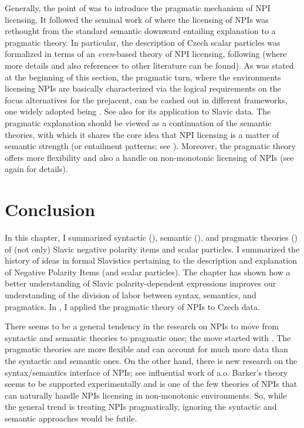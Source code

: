 \documentclass[output=paper,colorlinks,citecolor=brown]{langscibook}
\begin{document}
\noindent Generally, the point of  was to introduce the pragmatic mechanism of NPI licensing. It followed the seminal work of \citet{krifka1995semantics} where the licensing of NPIs was rethought from the standard semantic downward entailing explanation to a pragmatic theory. In particular, the description of Czech scalar particles was formalized in terms of an \textit{even}-based theory of NPI licensing, following \citet{Crnic2011} (where more details and also references to other literature can be found). As was stated at the beginning of this section, the pragmatic turn, where the environments licensing NPIs are basically characterized via the logical requirements on the focus alternatives for the prejacent, can be cashed out in different frameworks, one widely adopted being \citet{Chierchia2013}. See also \citet{gajic18} for its application to Slavic data. The pragmatic explanation should be viewed as a continuation of the semantic theories, %
with which it shares the core idea that NPI licensing is a matter of semantic strength (or entailment patterns; see ).
Moreover, the pragmatic theory offers more flexibility and also a handle on non-monotonic licensing of NPIs (see again \citealt{Crnic2011} for details).

\section{Conclusion}

In this chapter, I summarized syntactic (), semantic (), and pragmatic theories () of (not only) Slavic negative polarity items and scalar particles. I summarized the history of ideas in formal Slavistics pertaining to the description and explanation of Negative Polarity Items (and scalar particles). The chapter has shown how a better understanding of Slavic polarity-dependent expressions improves our understanding of the division of labor between syntax, semantics, and pragmatics. In , I applied the pragmatic theory of NPIs to Czech data. 

There seems to be a general tendency in the research on NPIs to move from syntactic and semantic theories to pragmatic ones; the move started with \citet{krifka1995semantics}. The pragmatic theories are more flexible and can account for much more data than the syntactic and semantic ones. On the other hand, there is new research on the syntax/semantics interface of NPIs; see influential work of \citet{barker2018negative} a.o. Barker's theory seems to be supported experimentally \citep{alexandropoulou2020there} and is one of the few theories of NPIs that can naturally handle NPIs licensing in non-monotonic environments. So, while the general trend is treating NPIs pragmatically, ignoring the syntactic and semantic approaches would be futile.  
\end{document}
